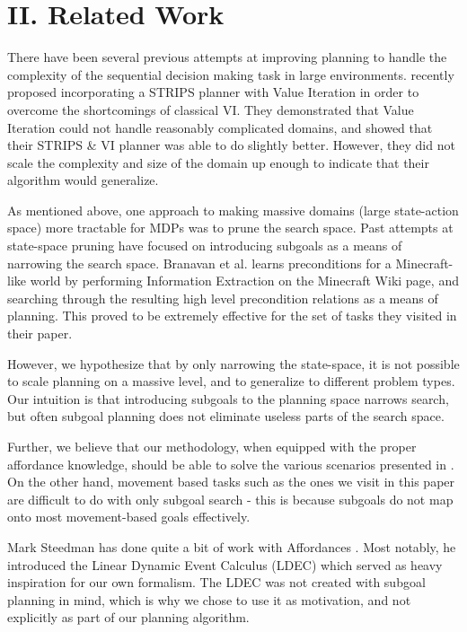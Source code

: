 \documentclass[a4paper]{article}
\begin{document}
\section{II. Related Work}
There have been several previous attempts at improving planning to handle the complexity of the sequential decision making task in large environments. \cite{Grounds2005} recently proposed incorporating a STRIPS planner with Value Iteration in order to overcome the shortcomings of classical VI. They demonstrated that Value Iteration could not handle reasonably complicated domains, and showed that their STRIPS \& VI planner was able to do slightly better. However, they did not scale the complexity and size of the domain up enough to indicate that their algorithm would generalize.

As mentioned above, one approach to making massive domains (large state-action space) more tractable for MDPs was to prune the search space. Past attempts at state-space pruning have focused on introducing subgoals as a means of narrowing the search space. Branavan et al. \cite{Branavan2012} learns preconditions for a Minecraft-like world by performing Information Extraction on the Minecraft Wiki page, and searching through the resulting high level precondition relations as a means of planning. This proved to be extremely effective for the set of tasks they visited in their paper.

However, we hypothesize that by only narrowing the state-space, it is not possible to scale planning on a massive level, and to generalize to different problem types. Our intuition is that introducing subgoals to the planning space narrows search, but often subgoal planning does not eliminate useless parts of the search space.

Further, we believe that our methodology, when equipped with the proper affordance knowledge, should be able to solve the various scenarios presented in \cite{Branavan2012}. On the other hand, movement based tasks such as the ones we visit in this paper are difficult to do with only subgoal search - this is because subgoals do not map onto most movement-based goals effectively.

Mark Steedman has done quite a bit of work with Affordances \cite{Steedman2011} \cite{Steedman2002}. Most notably, he introduced the Linear Dynamic Event Calculus (LDEC) which served as heavy inspiration for our own formalism. The LDEC was not created with subgoal planning in mind, which is why we chose to use it as motivation, and not explicitly as part of our planning algorithm.
\end{document}
